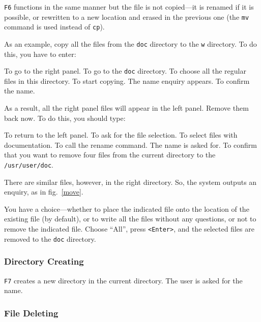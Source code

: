 {\tt F6} functions in the same manner but the file is not
copied---it is renamed if it is possible, or rewritten to a
new location and erased in the previous one (the {\tt mv}
command is used instead of {\tt cp}).

As an example, copy all the files from the {\tt doc} directory
to the {\tt w} directory. To do this, you have to enter:
\begin{example}
To go to the right panel.
To go to the {\tt doc} directory.
To choose all the regular files in this directory.
To start copying. The name enquiry appears.
To confirm the name.
\end{example}

As a result, all the right panel files will appear in the left
panel. Remove them back now. To do this, you should type:

\begin{example}
To return to the left panel.
\litem{{\tt +}}
To ask for the file selection.
To select files with documentation.
To call the rename command. The name is asked for.
To confirm that you want to remove four files from the current
directory to the {\tt /usr/user/doc}.
\end{example}

There are similar files, however, in the right directory. So,
the system outputs an enquiry, as in fig.~\ref{move}.


You have a choice---whether to place the indicated file
onto the location of the existing file (by default), or to 
write all the files without any questions, or not to 
remove the indicated file. Choose ``All'', press {\tt <Enter>},
and the selected files are removed to the {\tt doc} directory.

\subsubsection{Directory Creating}

{\tt F7} creates a new directory in the current directory. The
user is asked for the name. 

\subsubsection{File Deleting}

